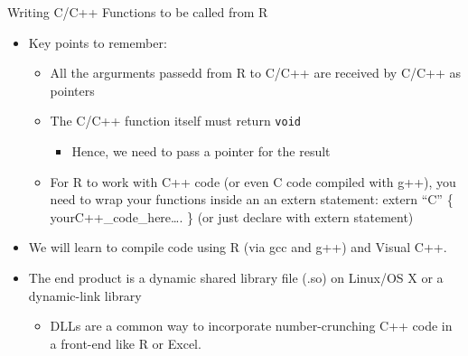 \documentclass[ignorenonframetext,]{beamer}
\providecommand{\tightlist}{%
\setlength{\itemsep}{0pt}\setlength{\parskip}{0pt}}
\begin{document}
\begin{frame}[fragile]{Writing C/C++ Functions to be called from R}

\begin{itemize}
\tightlist
\item
  Key points to remember:

  \begin{itemize}
  \tightlist
  \item
    All the argurments passedd from R to C/C++ are received by C/C++ as
    pointers
  \item
    The C/C++ function itself must return \texttt{void}

    \begin{itemize}
    \tightlist
    \item
      Hence, we need to pass a pointer for the result
    \end{itemize}
  \item
    For R to work with C++ code (or even C code compiled with g++), you
    need to wrap your functions inside an an extern statement: extern
    ``C'' \{ yourC++\_code\_here\ldots{}. \} (or just declare with
    extern statement)
  \end{itemize}
\item
  We will learn to compile code using R (via gcc and g++) and Visual
  C++.
\item
  The end product is a dynamic shared library file (.so) on Linux/OS X
  or a dynamic-link library

  \begin{itemize}
  \tightlist
  \item
    DLLs are a common way to incorporate number-crunching C++ code in a
    front-end like R or Excel.
  \end{itemize}
\end{itemize}

\end{frame}
\end{document}
